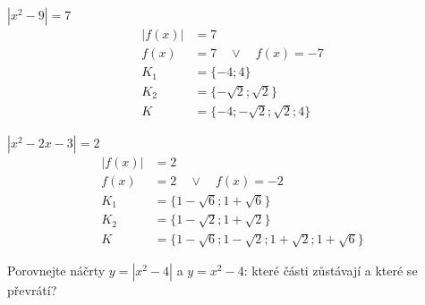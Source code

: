 \documentclass[11pt,a4paper]{article}
\begin{document}
\begin{zadaniReseniBox}[title={Samostatná práce 1}]
$\left|x^{2} - 9\right|=7$
\tcblower
\[
\begin{aligned}
|f(x)|&=7\\[2pt]
f(x)&=7\quad\vee\quad f(x)=-7\\[2pt]
K_1&=\{-4;4\}\\[2pt]
K_2&=\{- \sqrt{2};\sqrt{2}\}\\[2pt]
K&=\{-4;- \sqrt{2};\sqrt{2};4\}
\end{aligned}
\]
\end{zadaniReseniBox}
\begin{zadaniReseniBox}[title={Samostatná práce 2}]
$\left|x^{2} - 2x - 3\right|=2$
\tcblower
\[
\begin{aligned}
|f(x)|&=2\\[2pt]
f(x)&=2\quad\vee\quad f(x)=-2\\[2pt]
K_1&=\{1 - \sqrt{6};1 + \sqrt{6}\}\\[2pt]
K_2&=\{1 - \sqrt{2};1 + \sqrt{2}\}\\[2pt]
K&=\{1 - \sqrt{6};1 - \sqrt{2};1 + \sqrt{2};1 + \sqrt{6}\}
\end{aligned}
\]
\end{zadaniReseniBox}
Porovnejte náčrty $y=|x^2-4|$ a $y=x^2-4$: které části zůstávají a které se převrátí?
\end{document}

